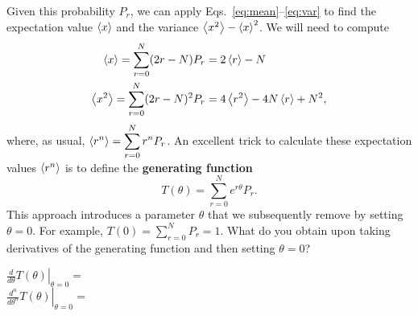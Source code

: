 Given this probability $P_r$, we can apply Eqs.~\ref{eq:mean}--\ref{eq:var} to find the expectation value $\left\langle x \right\rangle$ and the variance $\left\langle x^2 \right\rangle - \left\langle x \right\rangle^2$.
We will need to compute
\begin{equation}
  \label{eq:RWmoments}
  \begin{split}
    \left\langle x \right\rangle   = \sum_{r = 0}^N (2r - N)   P_r & = 2\left\langle r \right\rangle - N \\
    \left\langle x^2 \right\rangle = \sum_{r = 0}^N (2r - N)^2 P_r & = 4\left\langle r^2 \right\rangle - 4N\left\langle r \right\rangle + N^2,
  \end{split}
\end{equation}
where, as usual, $\displaystyle \left\langle r^n \right\rangle = \sum_{r = 0}^N r^n P_r$.
An excellent trick to calculate these expectation values $\left\langle r^n \right\rangle$ is to define the \textbf{generating function}
\begin{equation}
  T(\theta) = \sum_{r = 0}^N e^{r \theta} P_r.
\end{equation}
\newpage %
\noindent This approach introduces a parameter $\theta$ that we subsequently remove by setting $\theta = 0$.
For example, $T(0) = \sum_{r = 0}^N P_r = 1$.
What do you obtain upon taking derivatives of the generating function and then setting $\theta = 0$?
\begin{mdframed}
  $\displaystyle \left.\frac{d}{d\theta} T(\theta)\right|_{\theta = 0} = $ \\[50 pt]
  $\displaystyle \left.\frac{d^n}{d\theta^n} T(\theta)\right|_{\theta = 0} = $ \\[50 pt]
\end{mdframed}

